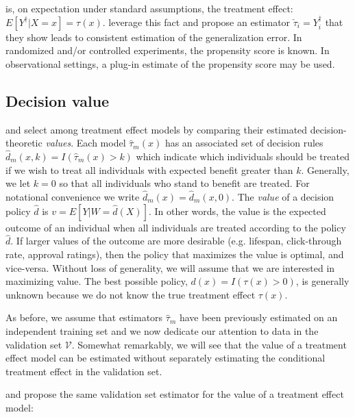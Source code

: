is, on expectation under standard assumptions, the treatment effect: $E[Y^{\dagger}|X=x] = \tau(x)$. \citet{Gutierrez:2016tq} leverage this fact and propose an estimator $\check \tau_i = Y^{\dagger}_i$ that they show leads to consistent estimation of the generalization error. In randomized and/or controlled experiments, the propensity score is known. In observational settings, a plug-in estimate of the propensity score may be used.


\subsection{Decision value}
\label{sec:value}

\citet{Kapelner:3baXYEjR} and \citet{Zhao:2017wa} select among treatment effect models by comparing their estimated decision-theoretic \emph{values}. Each model $\hat\tau_m(x)$ has an associated set of decision rules $\hat d_{m}(x,k) = I(\hat\tau_m(x) > k)$ which indicate which individuals should be treated if we wish to treat all individuals with expected benefit greater than $k$. Generally, we let $k=0$ so that all individuals who stand to benefit are treated. For notational convenience we write $\hat d_m(x) = \hat d_{m}(x,0)$. The \emph{value} of a decision policy $\hat d$ is $v = E[Y|W=\hat d(X)]$. In other words, the value is the expected outcome of an individual when all individuals are treated according to the policy $\hat d$. If larger values of the outcome are more desirable (e.g. lifespan, click-through rate, approval ratings), then the policy that maximizes the value is optimal, and vice-versa. Without loss of generality, we will assume that we are interested in maximizing value. The best possible policy, $d(x) = I(\tau(x) > 0)$, is generally unknown because we do not know the true treatment effect $\tau(x)$. 

As before, we assume that estimators $\hat\tau_m$ have been previously estimated on an independent training set and we now dedicate our attention to data in the validation set $\mathcal{V}$. Somewhat remarkably, we will see that the value of a treatment effect model can be estimated without separately estimating the conditional treatment effect in the validation set.

\citet{Kapelner:3baXYEjR} and \cite{Zhao:2017wa} propose the same validation set estimator for the value of a treatment effect model:


